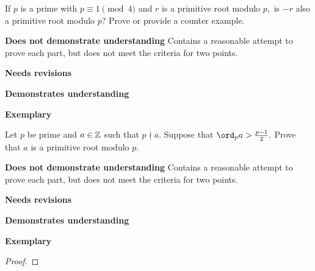 \documentclass[letterpaper, 11pt]{../ximera}
\begin{document}
\begin{solution}
 
\end{solution}

\begin{ex}
	If $p$ is a prime with $p\equiv 1\pmod{4}$ and $r$ is a primitive root modulo $p,$ is $-r$ also a primitive root modulo $p$? Prove or provide a counter example.
\end{ex}

\begin{writeRubric}
    \item \textbf{Does not demonstrate understanding}
     Contains a reasonable attempt to prove each part, but does not meet the criteria for two points.
    \item \textbf{Needs revisions}
     
    \item \textbf{Demonstrates understanding}
    
    \item \textbf{Exemplary}
        
\end{writeRubric}
                                       
\begin{solution}
 
\end{solution}

\begin{ex}
	Let $p$ be prime and $a\in\mathbb Z$ such that $p\nmid a.$ Suppose that $\ord_p a> \frac{p-1}{2}.$ Prove that $a$ is a primitive root modulo $p.$
\end{ex}

\begin{writeRubric}
    \item \textbf{Does not demonstrate understanding}
     Contains a reasonable attempt to prove each part, but does not meet the criteria for two points.
    \item \textbf{Needs revisions}
     
    \item \textbf{Demonstrates understanding}
    
    \item \textbf{Exemplary}
        
\end{writeRubric}
                                       
\begin{proof}
 
\end{proof}

\end{document}
